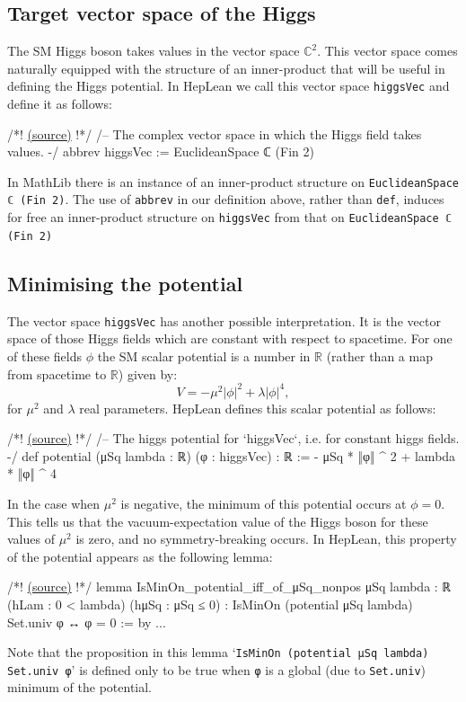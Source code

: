 \documentclass[a4paper, 11pt]{article}
\newcommand{\codeLink}[1]{
  \vspace{-0.5cm}\hfill\href{https://github.com/HEPLean/HepLean/blob/1b951994ae3d882242b02d23957ef1ee7fa05f3d/HepLean/#1}{(source)}
  }
\begin{document}
\subsection{Target vector space of the Higgs}
The SM Higgs boson takes values in the vector space $\mathbb{C}^2$.
This vector space comes naturally equipped with the structure of an inner-product that will be useful in defining the Higgs potential. In HepLean we call this vector space \lstinline|higgsVec| and define it as follows:
\begin{code}
/*!\codeLink{StandardModel/HiggsField.lean\#L39}!*/
/-- The complex vector space in which the Higgs field takes values. -/
abbrev higgsVec := EuclideanSpace ℂ (Fin 2)
\end{code}
In MathLib there is an instance of an inner-product structure on  \lstinline|EuclideanSpace ℂ (Fin 2)|.
The use of  \lstinline|abbrev| in our definition above, rather than \lstinline|def|, 
induces for free an inner-product structure on \lstinline|higgsVec| from that on
 \lstinline|EuclideanSpace ℂ (Fin 2)|


\subsection{Minimising the potential}\label{sec:MinPotential}
The vector space \lstinline|higgsVec| has another possible interpretation. It is the vector space of those Higgs fields which are constant with respect to spacetime. For one of these fields $\phi$ the SM scalar potential is a number in $\mathbb{R}$ (rather than a map from spacetime to $\mathbb{R}$) given by:
\begin{equation*}
V = - \mu^2 |\phi|^2 + \lambda |\phi|^4,
\end{equation*}
for $\mu^2$ and $\lambda$ real parameters.
HepLean defines this scalar potential as follows:
 \begin{code}
 /*!\codeLink{StandardModel/HiggsField.lean\#L114}!*/
 /-- The higgs potential for `higgsVec`, i.e. for constant higgs fields. -/
def potential (μSq lambda : ℝ) (φ : higgsVec) : ℝ := - μSq  * ‖φ‖ ^ 2  +
  lambda * ‖φ‖ ^ 4	
 \end{code}

In the case when $\mu^2$ is negative, the minimum of this potential occurs at $\phi = 0$. This tells us that the vacuum-expectation value of the Higgs boson for these values of $\mu^2$ is zero, and no symmetry-breaking occurs. In HepLean, this property of the potential   appears as the following lemma:
\begin{code}
 /*!\codeLink{StandardModel/HiggsField.lean\#L265}!*/
lemma IsMinOn_potential_iff_of_μSq_nonpos {μSq lambda : ℝ} 
    (hLam : 0 < lambda) (hμSq : μSq ≤ 0) :
    IsMinOn (potential μSq lambda) Set.univ φ ↔ φ = 0 := by
   ...
\end{code}
Note that the proposition in this lemma  `\lstinline|IsMinOn (potential μSq lambda) Set.univ φ|' is defined only to be true when \lstinline|φ| is a global (due to \lstinline|Set.univ|) minimum of the potential.
\end{document}
